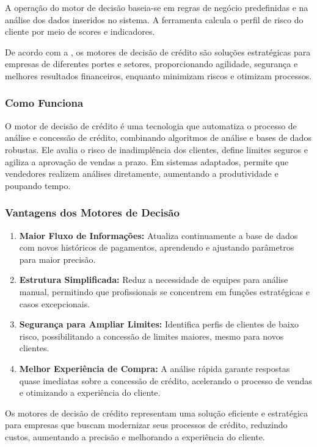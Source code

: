 \documentclass[12pt,a4paper]{article}
\begin{document}
A operação do motor de decisão baseia-se em regras de negócio predefinidas e na análise dos dados inseridos no sistema. A ferramenta calcula o perfil de risco do cliente por meio de scores e indicadores. 

De acordo com a \cite{deps_sd}, os motores de decisão de crédito são soluções estratégicas para empresas de diferentes portes e setores, proporcionando agilidade, segurança e melhores resultados financeiros, enquanto minimizam riscos e otimizam processos.

\subsubsection{Como Funciona}

O motor de decisão de crédito é uma tecnologia que automatiza o processo de análise e concessão de crédito, combinando algoritmos de análise e bases de dados robustas. Ele avalia o risco de inadimplência dos clientes, define limites seguros e agiliza a aprovação de vendas a prazo. Em sistemas adaptados, permite que vendedores realizem análises diretamente, aumentando a produtividade e poupando tempo.

\subsubsection{Vantagens dos Motores de Decisão}

\begin{enumerate}
    \item \textbf{Maior Fluxo de Informações:} Atualiza continuamente a base de dados com novos históricos de pagamentos, aprendendo e ajustando parâmetros para maior precisão.
    \item \textbf{Estrutura Simplificada:} Reduz a necessidade de equipes para análise manual, permitindo que profissionais se concentrem em funções estratégicas e casos excepcionais.
    \item \textbf{Segurança para Ampliar Limites:} Identifica perfis de clientes de baixo risco, possibilitando a concessão de limites maiores, mesmo para novos clientes.
    \item \textbf{Melhor Experiência de Compra:} A análise rápida garante respostas quase imediatas sobre a concessão de crédito, acelerando o processo de vendas e otimizando a experiência do cliente.
\end{enumerate}

Os motores de decisão de crédito representam uma solução eficiente e estratégica para empresas que buscam modernizar seus processos de crédito, reduzindo custos, aumentando a precisão e melhorando a experiência do cliente.
\end{document}
